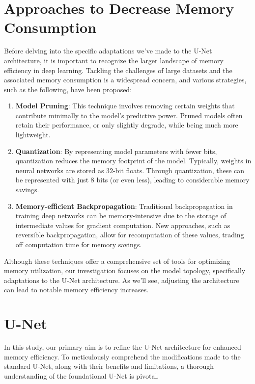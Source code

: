 \section{Approaches to Decrease Memory Consumption}
Before delving into the specific adaptations we've made to the U-Net architecture, it is important to recognize the larger landscape of memory efficiency in deep learning.
Tackling the challenges of large datasets and the associated memory consumption is a widespread concern,
and various strategies, such as the following, have been proposed:
\begin{enumerate}
	\item \textbf{Model Pruning}: This technique involves removing certain weights that contribute minimally to the model's predictive power.
	Pruned models often retain their performance, or only slightly degrade, while being much more lightweight\cite{chong_resource_2023}.
	\item \textbf{Quantization}: By representing model parameters with fewer bits, quantization reduces the memory footprint of the model. Typically,
	weights in neural networks are stored as $32$-bit floats. Through quantization, these can be represented with just $8$ bits (or even less), leading to considerable memory savings\cite{gholami_survey_2021}.
	\item \textbf{Memory-efficient Backpropagation}: Traditional backpropagation in training deep networks can be memory-intensive due to the storage of intermediate values for gradient computation.
	New approaches, such as reversible backpropagation, allow for recomputation of these values, trading off computation time for memory savings\cite{brugger_partially_2019}.
\end{enumerate}
Although these techniques offer a comprehensive set of tools for optimizing memory utilization, our investigation focuses on the model topology, specifically adaptations to the U-Net architecture.
As we'll see, adjusting the architecture can lead to notable memory efficiency increases.

\section{U-Net}
In this study, our primary aim is to refine the U-Net architecture for enhanced memory efficiency. To meticulously comprehend the modifications made to the standard U-Net,
along with their benefits and limitations, a thorough understanding of the foundational U-Net is pivotal.

